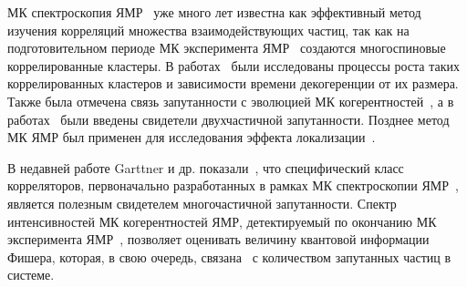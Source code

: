 



МК спектроскопия ЯМР~\cite{Baum1985} уже много лет известна как эффективный метод изучения корреляций множества взаимодействующих частиц,
так как на подготовительном периоде МК эксперимента ЯМР~\cite{Baum1985} создаются многоспиновые коррелированные кластеры.
В работах~\cite{Krojanski2004, Cho2006, Bochkin2018} были исследованы процессы роста таких коррелированных кластеров и зависимости времени декогеренции от их размера.
Также была отмечена связь запутанности с эволюцией МК когерентностей~\cite{Doronin2003, Furman2008, Furman2009},
а в работах~\cite{Feldman2008, Feldman2012} были введены свидетели двухчастичной запутанности.
Позднее метод МК ЯМР был применен для исследования эффекта локализации~\cite{Alvarez2010, Alvarez2013, Alvarez2015, Wei2018}.

В недавней работе Garttner и др. показали~\cite{Garttner2018},
что специфический класс корреляторов,
первоначально разработанных в рамках МК спектроскопии ЯМР~\cite{Baum1985},
является полезным свидетелем многочастичной запутанности.
Спектр интенсивностей МК когерентностей ЯМР,
детектируемый по окончанию МК эксперимента ЯМР~\cite{Baum1985},
позволяет оценивать величину квантовой информации Фишера,
которая, в свою очередь, связана~\cite{Toth2014} с количеством запутанных частиц в системе.

